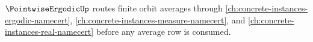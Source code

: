 $\PointwiseErgodicUp$ routes finite orbit averages through \autoref{ch:concrete-instances-ergodic-namecert}, \autoref{ch:concrete-instances-measure-namecert}, and \autoref{ch:concrete-instances-real-namecert} before any average row is consumed.



